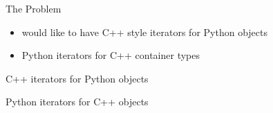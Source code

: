 
\begin{frame}[fragile]{The Problem}
    \begin{itemize}
        \item would like to have C++ style iterators for Python objects
        \item Python iterators for C++ container types
    \end{itemize}
\end{frame}

\begin{frame}[fragile]{C++ iterators for Python objects}
\end{frame}

\begin{frame}[fragile]{Python iterators for C++ objects}
\end{frame}
